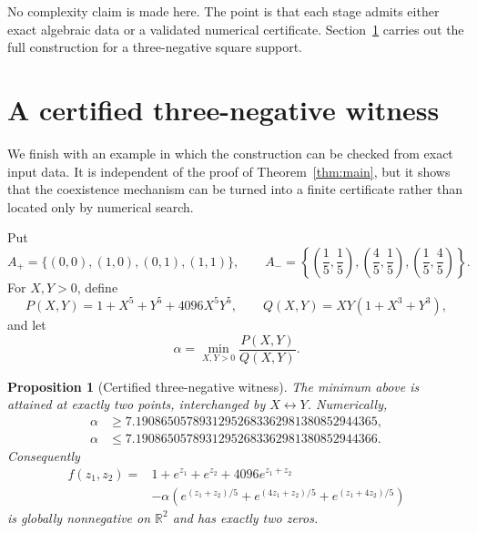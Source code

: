 \documentclass[11pt]{article}
\theoremstyle{plain}
\newtheorem{proposition}[theorem]{Proposition}
\theoremstyle{definition}
\theoremstyle{remark}
\newcommand{\R}{\mathbb R}
\begin{document}
No complexity claim is made here. The point is that each stage admits either exact algebraic data or a validated numerical certificate. Section~\ref{sec:certified-witness} carries out the full construction for a three-negative square support.


\section{A certified three-negative witness}\label{sec:certified-witness}

We finish with an example in which the construction can be checked from exact input data. It is independent of the proof of Theorem~\ref{thm:main}, but it shows that the coexistence mechanism can be turned into a finite certificate rather than located only by numerical search.

Put
\[
 A_+=\{(0,0),(1,0),(0,1),(1,1)\},
 \qquad
 A_-=\left\{\left(\frac15,\frac15\right),
 \left(\frac45,\frac15\right),
 \left(\frac15,\frac45\right)\right\}.
\]
For $X,Y>0$, define
\[
 P(X,Y)=1+X^5+Y^5+4096X^5Y^5,
 \qquad
 Q(X,Y)=XY(1+X^3+Y^3),
\]
and let
\[
 \alpha=\min_{X,Y>0}\frac{P(X,Y)}{Q(X,Y)}.
\]

\begin{proposition}[Certified three-negative witness]\label{prop:certified-witness}
The minimum above is attained at exactly two points, interchanged by $X\leftrightarrow Y$.  Numerically,
\[
 \begin{aligned}
 \alpha&\ge 7.19086505789312952683362981380852944365,\\
 \alpha&\le 7.19086505789312952683362981380852944366.
 \end{aligned}
\]
Consequently
\begin{align}\label{eq:certified-witness}
 f(z_1,z_2)={}&1+e^{z_1}+e^{z_2}+4096e^{z_1+z_2}\\
 &-\alpha\left(
 e^{(z_1+z_2)/5}+e^{(4z_1+z_2)/5}+e^{(z_1+4z_2)/5}
 \right)
\end{align}
is globally nonnegative on $\R^2$ and has exactly two zeros.
\end{proposition}
\end{document}
